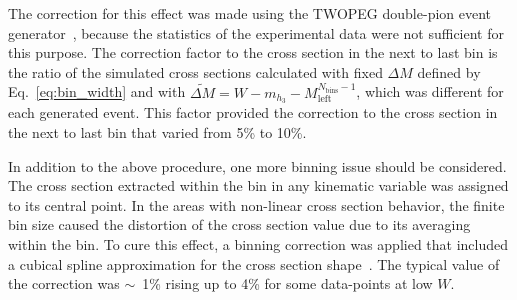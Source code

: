 \documentclass[prc,twocolumn,superscriptaddress,showpacs,amssymb,amsmath,amsfonts,aps,nofootinbib]{revtex4-1}
\begin{document}
The correction for this effect was made using the TWOPEG double-pion event generator~\cite{Skorodum:EG}, because the statistics of the experimental data were not sufficient for this purpose. 
The correction factor to the cross section in the next to last bin is the ratio of the simulated cross sections calculated with fixed $\Delta M$ defined by Eq.~\eqref{eq:bin_width} and with $\widetilde{\Delta M} = W - m_{h_{3}} - M_{\text{left}}^{N_{\text{bins}}-1}$, which was different for each generated event. This factor provided the correction to the cross section in the next to last bin that varied from 5\% to 10\%.


In addition to the above procedure, one more binning issue should be considered.
The cross section extracted within the bin in any kinematic variable was assigned to its central point. In the areas with non-linear cross section behavior, the finite bin size caused the distortion of the cross section value due to its averaging within the bin. To cure this effect, a binning correction was applied that included a cubical spline approximation for the cross section shape~\cite{Fed_an_note:2017}. The typical value of the correction was $\sim$~1\% rising up to 4\% for some data-points at low $W$. 
\end{document}
